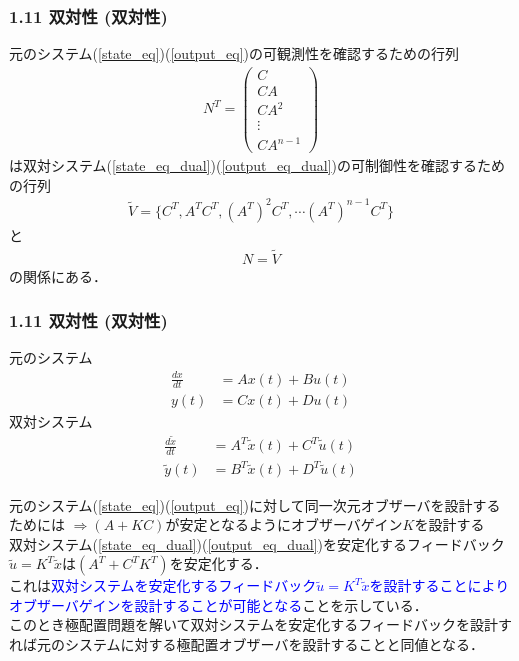 \documentclass[10pt]{beamer}
\begin{document}
\begin{frame}[t]
\frametitle{1.11 双対性 (双対性)}
元のシステム(\ref{state_eq})(\ref{output_eq})の可観測性を確認するための行列
\begin{align}
 N^T =
  \left( \begin{array}{c}
         C        \\
   C A      \\
   C A^2    \\
   \vdots   \\
   C A^{n-1}
  \end{array} \right)
\nonumber
\end{align}
は双対システム(\ref{state_eq_dual})(\ref{output_eq_dual})の可制御性を確認するための行列
\begin{align}
     \tilde{V} = \{C^T, A^T C^T, (A^T)^2 C^T , \cdots (A^T)^{n-1} C^T \}
\nonumber
\end{align}
と
\begin{align}
  N = \tilde{V}
\end{align}
の関係にある．

\end{frame}



\begin{frame}[t]
\frametitle{1.11 双対性 (双対性)}
元のシステム
\begin{align}
 \frac{dx}{dt} &= A x(t) + B u(t)  \\
 y(t) &= C x(t) + D u(t) 
\end{align}
双対システム
\begin{align}
 \frac{d \tilde{x}}{dt} &= A^T \tilde{x}(t) + C^T \tilde{u}(t)  \\
 \tilde{y}(t) &= B^T \tilde{x}(t) + D^T \tilde{u}(t) 
\end{align}

元のシステム(\ref{state_eq})(\ref{output_eq})に対して同一次元オブザーバを設計する
ためには
$\Longrightarrow (A+KC)$が安定となるようにオブザーバゲイン$K$を設計する\\
双対システム(\ref{state_eq_dual})(\ref{output_eq_dual})を安定化するフィードバック$\tilde{u} =  K^T \tilde{x}$は$(A^T + C^T K^T)$を安定化する．\\
これは\textcolor{blue}{双対システムを安定化するフィードバック$\tilde{u} =  K^T \tilde{x}$を設計することによりオブザーバゲインを設計することが可能となる}ことを示している．\\
このとき極配置問題を解いて双対システムを安定化するフィードバックを設計すれば元のシステムに対する極配置オブザーバを設計することと同値となる．

\end{frame}
\end{document}
